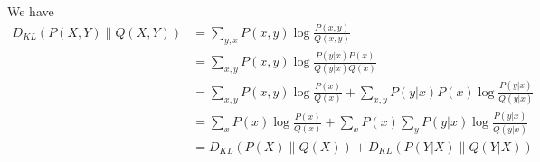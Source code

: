 \begin{answer}
    We have
    $$
    \begin{aligned}
        D_{KL}(P(X, Y)\|Q(X, Y)) &= \sum_{y, x} P(x, y)\log\frac{P(x, y)}{Q(x, y)}\\
        &= \sum_{x, y} P(x, y) \log \frac{P(y|x)P(x)}{Q(y|x)Q(x)} \\
        & = \sum_{x,y}P(x, y)\log\frac{P(x)}{Q(x)} + \sum_{x, y}P(y|x)P(x)\log\frac{P(y|x)}{Q(y|x)}\\
        &= \sum_{x}P(x)\log\frac{P(x)}{Q(x)} + \sum_{x}P(x)\sum_{y}P(y|x)\log\frac{P(y|x)}{Q(y|x)}\\
        &= D_{KL}(P(X)\|Q(X)) + D_{KL}(P(Y|X)\|Q(Y|X))
    \end{aligned}
    $$
\end{answer}
